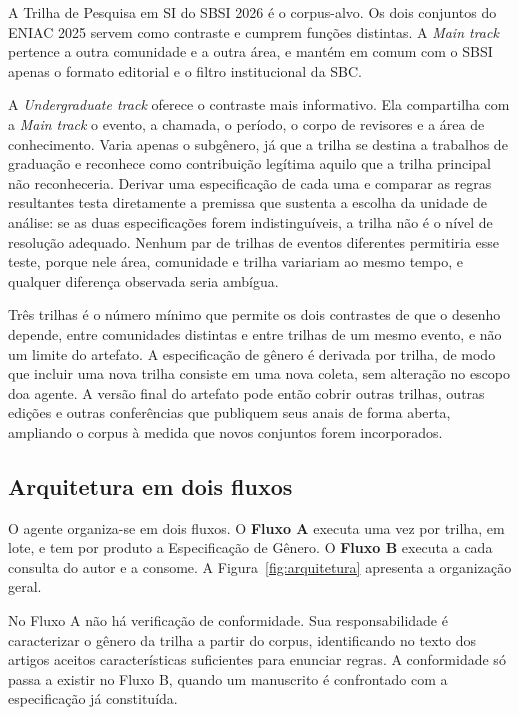 A Trilha de Pesquisa em SI do SBSI 2026 é o corpus-alvo. Os dois conjuntos do ENIAC 2025 servem como contraste e cumprem funções distintas. A \textit{Main track} pertence a outra comunidade e a outra área, e mantém em comum com o SBSI apenas o formato editorial e o filtro institucional da SBC.

A \textit{Undergraduate track} oferece o contraste mais informativo. Ela compartilha com a \textit{Main track} o evento, a chamada, o período, o corpo de revisores e a área de conhecimento. Varia apenas o subgênero, já que a trilha se destina a trabalhos de graduação e reconhece como contribuição legítima aquilo que a trilha principal não reconheceria. Derivar uma especificação de cada uma e comparar as regras resultantes testa diretamente a premissa que sustenta a escolha da unidade de análise: se as duas especificações forem indistinguíveis, a trilha não é o nível de resolução adequado. Nenhum par de trilhas de eventos diferentes permitiria esse teste, porque nele área, comunidade e trilha variariam ao mesmo tempo, e qualquer diferença observada seria ambígua.

Três trilhas é o número mínimo que permite os dois contrastes de que o desenho depende, entre comunidades distintas e entre trilhas de um mesmo evento, e não um limite do artefato. A especificação de gênero é derivada por trilha, de modo que incluir uma nova trilha consiste em uma nova coleta, sem alteração no escopo doa agente. A versão final do artefato pode então cobrir outras trilhas, outras edições e outras conferências que publiquem seus anais de forma aberta, ampliando o corpus à medida que novos conjuntos forem incorporados.

\subsection{Arquitetura em dois fluxos}
\label{sec:arquitetura-conformidade}

O agente organiza-se em dois fluxos. O \textbf{Fluxo A} executa uma vez por trilha, em lote, e tem por produto a Especificação de Gênero. O \textbf{Fluxo B} executa a cada consulta do autor e a consome. A Figura~\ref{fig:arquitetura} apresenta a organização geral.

No Fluxo A não há verificação de conformidade. Sua responsabilidade é caracterizar o gênero da trilha a partir do corpus, identificando no texto dos artigos aceitos características suficientes para enunciar regras. A conformidade só passa a existir no Fluxo B, quando um manuscrito é confrontado com a especificação já constituída.

